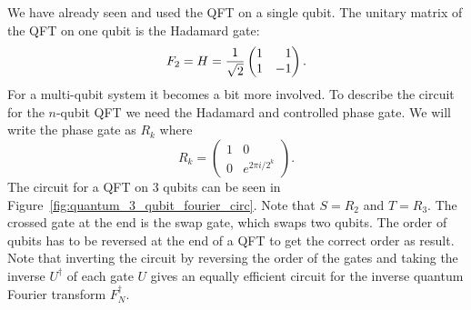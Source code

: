 We have already seen and used the QFT on a single qubit. The unitary matrix of the QFT on one qubit is the Hadamard gate:
\begin{equation}
  F_2 = H = \hgate.
\end{equation}
For a multi-qubit system it becomes a bit more involved. To describe the circuit for the $n$-qubit QFT we need the Hadamard and controlled phase gate. We will write the phase gate as $R_k$ where
\begin{equation}
  R_k = \begin{pmatrix}
    1 & 0 \\
    0 & e^{2\pi i/2^k}
  \end{pmatrix}.
\end{equation}
The circuit for a QFT on 3 qubits can be seen in Figure~\ref{fig:quantum_3_qubit_fourier_circ}. Note that $S = R_2$ and $T = R_3$. The crossed gate at the end is the swap gate, which swaps two qubits. The order of qubits has to be reversed at the end of a QFT to get the correct order as result. Note that inverting the circuit by reversing the order of the gates and taking the inverse $U^\dagger$ of each gate $U$ gives an equally efficient circuit for the inverse quantum Fourier transform $F_N^\dagger$.


